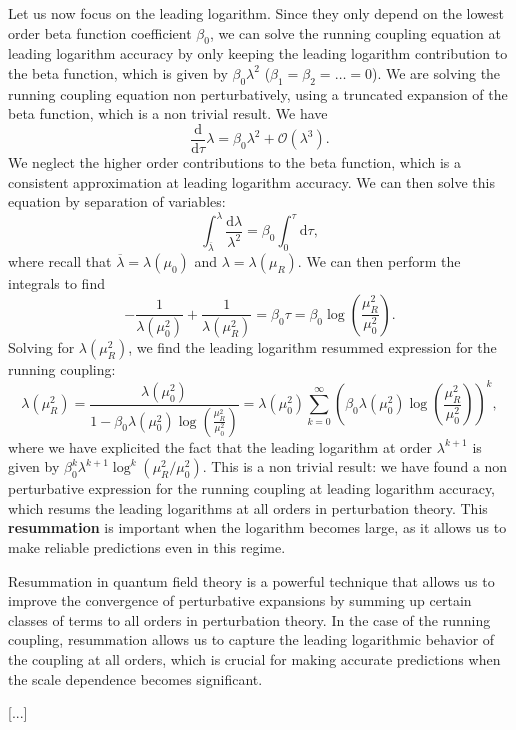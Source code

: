 Let us now focus on the leading logarithm. Since they only depend on the lowest order beta function coefficient \(\beta_0\), we can solve the running coupling equation at leading logarithm accuracy by only keeping the leading logarithm contribution to the beta function, which is given by \(\beta_0 \lambda^2\) (\(\beta_1 = \beta_2 = \dots = 0\)). We are solving the running coupling equation non perturbatively, using a truncated expansion of the beta function, which is a non trivial result. We have
\[
    \frac{\mathrm{d}}{\mathrm{d} \tau} \lambda = \beta_0 \lambda^2 + \mathcal{O} \left( \lambda^3 \right).
\]
We neglect the higher order contributions to the beta function, which is a consistent approximation at leading logarithm accuracy. We can then solve this equation by separation of variables:
\[
    \int_{\overline{\lambda}}^{\lambda} \frac{\mathrm{d} \lambda}{\lambda^2} = \beta_0 \int_0^{\tau} \mathrm{d} \tau,
\]
where recall that \(\overline{\lambda} = \lambda(\mu_0)\) and \(\lambda = \lambda(\mu_R)\). We can then perform the integrals to find
\[
    - \frac{1}{\lambda(\mu_0^2)} + \frac{1}{\lambda(\mu_R^2)} = \beta_0 \tau = \beta_0 \log \left( \frac{\mu_R^2}{\mu_0^2} \right).
\]
Solving for \(\lambda(\mu_R^2)\), we find the leading logarithm resummed expression for the running coupling:
\[
    \lambda(\mu_R^2) = \frac{\lambda(\mu_0^2)}{1 - \beta_0 \lambda(\mu_0^2) \log \left( \frac{\mu_R^2}{\mu_0^2} \right)} = \lambda(\mu_0^2) \sum_{k=0}^{\infty} \left( \beta_0 \lambda(\mu_0^2) \log \left( \frac{\mu_R^2}{\mu_0^2} \right) \right)^k,
\]
where we have explicited the fact that the leading logarithm at order \(\lambda^{k+1}\) is given by \(\beta_0^k \lambda^{k+1} \log^k(\mu_R^2/\mu_0^2)\). This is a non trivial result: we have found a non perturbative expression for the running coupling at leading logarithm accuracy, which resums the leading logarithms at all orders in perturbation theory. This \textbf{resummation} is important when the logarithm becomes large, as it allows us to make reliable predictions even in this regime.

Resummation in quantum field theory is a powerful technique that allows us to improve the convergence of perturbative expansions by summing up certain classes of terms to all orders in perturbation theory. In the case of the running coupling, resummation allows us to capture the leading logarithmic behavior of the coupling at all orders, which is crucial for making accurate predictions when the scale dependence becomes significant.

    [...]

